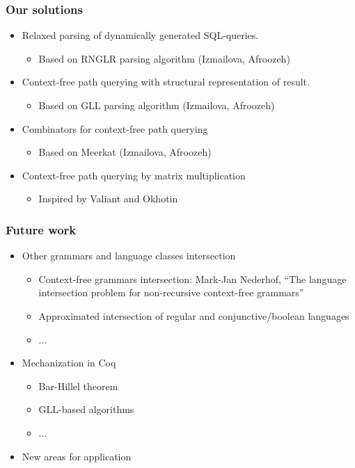 \documentclass{beamer}
\begin{document}
\begin{frame}
  \transwipe[direction=90]
  \frametitle{Our solutions}
  \begin{itemize}
    \item Relaxed parsing of dynamically generated SQL-queries.
    \begin{itemize}
        \item Based on RNGLR parsing algorithm (Izmailova, Afroozeh)
    \end{itemize}
    \item Context-free path querying with structural representation of result.
    \begin{itemize}
        \item Based on GLL parsing algorithm (Izmailova, Afroozeh)
    \end{itemize}
    \item Combinators for context-free path querying
    \begin{itemize}
        \item Based on Meerkat (Izmailova, Afroozeh)
    \end{itemize}
    \item Context-free path querying by matrix multiplication
    \begin{itemize}
        \item Inspired by Valiant and Okhotin
    \end{itemize}
  \end{itemize}
\end{frame}

\begin{frame}[fragile]
\transwipe[direction=90]
\frametitle{Future work}
\begin{itemize}
  \item Other grammars and language classes intersection
  \begin{itemize}
     \item Context-free grammars intersection: Mark-Jan Nederhof, ``The language intersection problem for non-recursive context-free grammars''
     \item Approximated intersection of regular and conjunctive/boolean languages
     \item ...
  \end{itemize}
  \item Mechanization in Coq
  \begin{itemize}
     \item Bar-Hillel theorem
     \item GLL-based algorithms
     \item ...
  \end{itemize}
  \item New areas for application
\end{itemize}
\end{frame}
            
\end{document}
